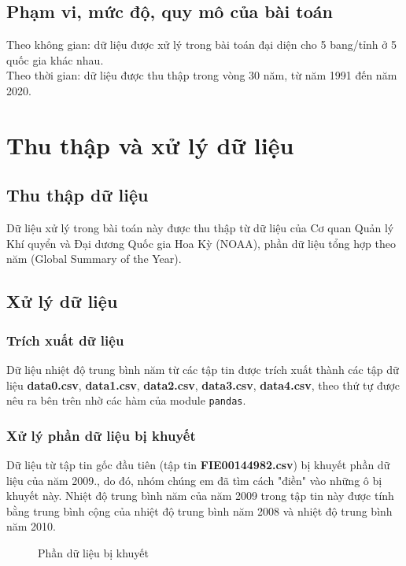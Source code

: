 \documentclass[a4paper]{article}
\begin{document}
\subsection{Phạm vi, mức độ, quy mô của bài toán}
Theo không gian: dữ liệu được xử lý trong bài toán đại diện cho 5 bang/tỉnh ở 5 quốc gia khác nhau.\\
Theo thời gian: dữ liệu được thu thập trong vòng 30 năm, từ năm 1991 đến năm 2020.

\section{Thu thập và xử lý dữ liệu}
\subsection{Thu thập dữ liệu}
Dữ liệu xử lý trong bài toán này được thu thập từ dữ liệu của Cơ quan Quản lý Khí quyển và Đại dương Quốc gia Hoa Kỳ (NOAA), phần dữ liệu tổng hợp theo năm (Global Summary of the Year).

\subsection{Xử lý dữ liệu}
\subsubsection{Trích xuất dữ liệu}
Dữ liệu nhiệt độ trung bình năm từ các tập tin được trích xuất thành các tập dữ liệu \textbf{data0.csv}, \textbf{data1.csv}, \textbf{data2.csv}, \textbf{data3.csv}, \textbf{data4.csv}, theo thứ tự được nêu ra bên trên nhờ các hàm của module \lstinline{pandas}.
\subsubsection{Xử lý phần dữ liệu bị khuyết}
Dữ liệu từ tập tin gốc đầu tiên (tập tin \textbf{FIE00144982.csv}) bị khuyết phần dữ liệu của năm 2009., do đó, nhóm chúng em đã tìm cách "điền" vào những ô bị khuyết này. Nhiệt độ trung bình năm của năm 2009 trong tập tin này được tính bằng trung bình cộng của nhiệt độ trung bình năm 2008 và nhiệt độ trung bình năm 2010.\\
\begin{figure}[H]
\caption{Phần dữ liệu bị khuyết}
\end{figure}
\end{document}
